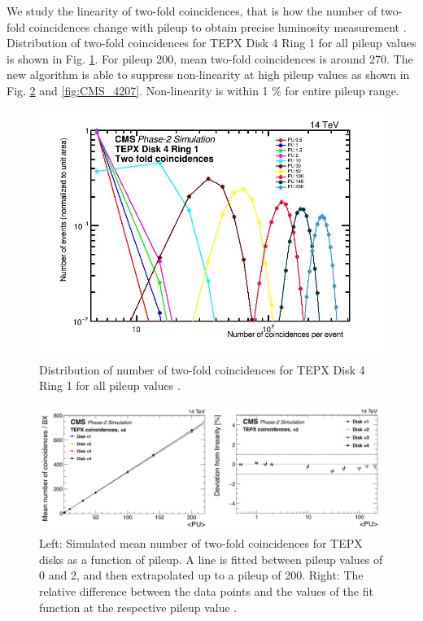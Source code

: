 
We study the linearity of two-fold coincidences, that is how the number of two-fold coincidences change with pileup to obtain precise luminosity measurement \cite{sehrawat2022optimisation}. Distribution of two-fold coincidences for TEPX Disk 4 Ring 1 for all pileup values is shown in Fig. \ref{fig:tepx_coin_allPU}. For pileup 200, mean two-fold coincidences is around 270. The new algorithm is able to suppress non-linearity at high pileup values as shown in Fig.  \ref{fig:CMS_420}  and \ref{fig:CMS_4207}. Non-linearity is within 1 \% for entire pileup range.

\begin{figure}[H]
  \centering
  \includegraphics[width=0.7\columnwidth]{ashish_thesis/tepx_D4R1_coin_allpu_1.png}
  \caption[TEPX D4R1 Two-Fold Coincidences All Pileup]{Distribution of number of two-fold coincidences for TEPX Disk 4 Ring 1 for all pileup values \cite{Collaboration:275907420}.}
  \label{fig:tepx_coin_allPU}
\end{figure}


\begin{figure}[H]
  \centering
  \includegraphics[width=1\columnwidth]{ashish_thesis/michigan_1.png}
  \caption[TEPX two-fold coincidences linear fit per disk]{\onehalfspacing Left: Simulated mean number of two-fold coincidences for TEPX disks as a function of pileup. A line is fitted between pileup values of 0 and 2, and then extrapolated up to a pileup of 200. Right: The relative difference between the data points and the values of the fit function at the respective pileup value \cite{Collaboration:275907420}.}
  \label{fig:CMS_420}
\end{figure}


